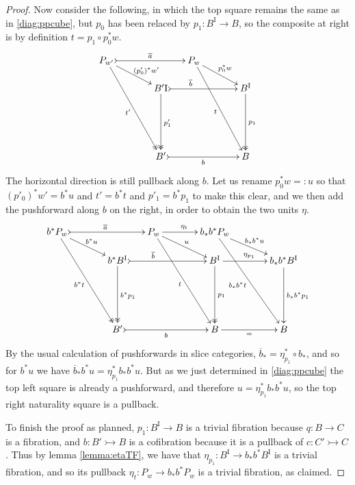 \documentclass[12pt]{article}
\newcommand{\mono}{\ensuremath{\rightarrowtail}}
\newcommand{\ra}{\ensuremath{\rightarrow}}
\newcommand{\I}{\ensuremath{\mathrm{I}}}
\theoremstyle{remark}
\theoremstyle{definition}
\begin{document}
\begin{proof}
Now consider the following, in which the top square remains the same as in \eqref{diag:ppcube}, but $p_0$ has been relaced by $p_1 : B^\I \ra B$, so the composite at right is by definition $t = p_1\circ p_0^*w$.
\begin{equation}\label{diag:twounits}
\xymatrix@=1.5em{
P_{w'} \ar@{->>}[ddddrr]_{t'} \ar[rrd]^>>>>>>{(p'_0)^*w'} \ar@{>->}[rrr]^{\overline{a}}
		&&& P_w \ar[ddddrr]_t \ar[rrd]^{p_0^*w} &&\\
&& B'^\I \ar@{->>}[ddd]^{p'_1} \ar@{>->}[rrr]^<<<<<<<<{\overline{b}}  
		&&& B^\I \ar@{->>}[ddd]^{p_1} \\
\\
\\
&& B'\ar@{>->}[rrr]_b &&& B
}
\end{equation}
The horizontal direction is still pullback along $b$.  Let us rename $p_0^*w=:u$ so that $(p'_0)^*w' = b^*u$ and $t' = b^*t$ and $p'_1 = b^*p_1$ to make this clear, and we then add the pushforward along $b$ on the right, in order to obtain the two units $\eta$.
\begin{equation}\label{diag:twounits2}
\xymatrix@=1.5em{
b^*P_{w} \ar@{->>}[ddddrr]_{b^*t} \ar[rrd]^{b^*u} \ar@{>->}[rrr]^{\overline{a}}
		&&& P_w \ar[ddddrr]_t \ar[rrd]^{u} \ar[rr]^{\eta_t}
		&& b_*b^* P_w  \ar[rrd]^{b_*b^* u} \ar[ddddrr]_{b_*b^* t}&&\\
&& b^*B^\I \ar@{->>}[ddd]^{b^*p_1} \ar@{>->}[rrr]^<<<<<<<<<{\overline{b}}  
		&&& B^\I \ar@{->>}[ddd]^{p_1} \ar[rr]^{\eta_{p_1}} 
		&& b_*b^* B^\I \ar[ddd]^{b_*b^*p_1}\\
\\
\\
&& B'\ar@{>->}[rrr]_b &&& B  \ar[rr]_= && B
}
\end{equation}
By the usual calculation of pushforwards in slice categories, $\overline{b}_* = \eta_{p_1}^*\circ b_*$, and so for $b^*u$ we have $\overline{b}_*b^* u = \eta_{p_1}^*b_*b^* u$.  But as we just determined in \eqref{diag:ppcube} the top left square is already a pushforward, and therefore $u = \eta_{p_1}^*b_*b^* u$,  so the top right naturality square is a pullback. 

To finish the proof as planned, $p_1 : B^\I \ra B$ is a trivial fibration because $q : B\ra C$ is a fibration, and $b : B' \mono B$ is a cofibration because it is a pullback of $c : C'\mono C$.  Thus by lemma \ref{lemma:etaTF}, we have that $\eta_{p_1}: B^\I \ra  b_*b^*B^\I$ is a trivial fibration, and so its pullback $\eta_t : P_w \ra  b_*b^*P_w$ is a trivial fibration, as claimed.
\end{proof}
\end{document}
